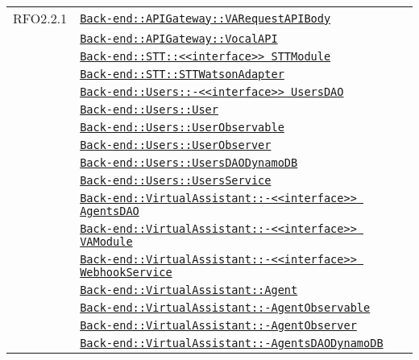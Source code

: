 \begin{longtable}{|>{\centering}m{3cm}|m{10cm}<{\centering}|}
RFO2.2.1 & \hyperref[Back-end::APIGateway::VARequestAPIBody]{\texttt{Back-end::APIGateway::VARequestAPIBody}}\\
& \hyperref[Back-end::APIGateway::VocalAPI]{\texttt{Back-end::APIGateway::VocalAPI}}\\
& \hyperref[Back-end::STT::<<interface>> STTModule]{\texttt{Back-end::STT::<<interface>> STTModule}}\\
& \hyperref[Back-end::STT::STTWatsonAdapter]{\texttt{Back-end::STT::STTWatsonAdapter}}\\
& \hyperref[Back-end::Users::<<interface>> UsersDAO]{\texttt{Back-end::Users::-\linebreak <<interface>> UsersDAO}}\\
& \hyperref[Back-end::Users::User]{\texttt{Back-end::Users::User}}\\
& \hyperref[Back-end::Users::UserObservable]{\texttt{Back-end::Users::UserObservable}}\\
& \hyperref[Back-end::Users::UserObserver]{\texttt{Back-end::Users::UserObserver}}\\
& \hyperref[Back-end::Users::UsersDAODynamoDB]{\texttt{Back-end::Users::UsersDAODynamoDB}}\\
& \hyperref[Back-end::Users::UsersService]{\texttt{Back-end::Users::UsersService}}\\
& \hyperref[Back-end::VirtualAssistant::<<interface>> AgentsDAO]{\texttt{Back-end::VirtualAssistant::-\linebreak <<interface>> AgentsDAO}}\\
& \hyperref[Back-end::VirtualAssistant::<<interface>> VAModule]{\texttt{Back-end::VirtualAssistant::-\linebreak <<interface>> VAModule}}\\
& \hyperref[Back-end::VirtualAssistant::<<interface>> WebhookService]{\texttt{Back-end::VirtualAssistant::-\linebreak <<interface>> WebhookService}}\\
& \hyperref[Back-end::VirtualAssistant::Agent]{\texttt{Back-end::VirtualAssistant::Agent}}\\
& \hyperref[Back-end::VirtualAssistant::AgentObservable]{\texttt{Back-end::VirtualAssistant::-\linebreak AgentObservable}}\\
& \hyperref[Back-end::VirtualAssistant::AgentObserver]{\texttt{Back-end::VirtualAssistant::-\linebreak AgentObserver}}\\
& \hyperref[Back-end::VirtualAssistant::AgentsDAODynamoDB]{\texttt{Back-end::VirtualAssistant::-\linebreak AgentsDAODynamoDB}}\\

\end{longtable}
